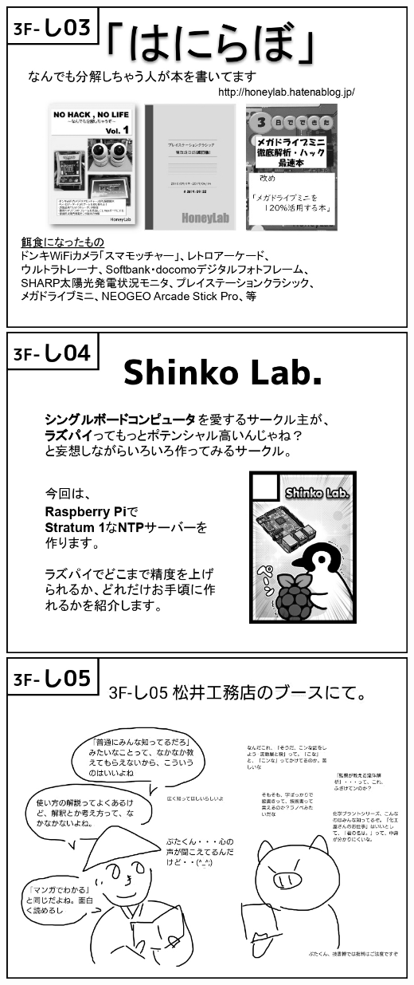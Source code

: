 \begin{center}
\includegraphics[width=0.9\linewidth]{images/circle-appeals/3F-し03.jpg}
\includegraphics[width=0.9\linewidth]{images/circle-appeals/3F-し04.jpg}
\includegraphics[width=0.9\linewidth]{images/circle-appeals/3F-し05.jpg}

\end{center}
